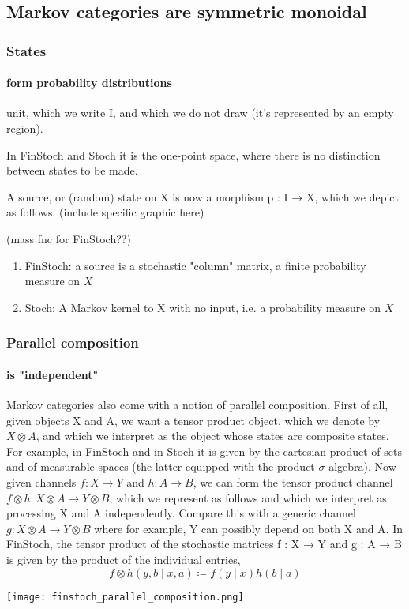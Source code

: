 \subsection{Markov categories are symmetric monoidal}
\begin{frame}
    \frametitle{States}
    \framesubtitle{form probability distributions}
unit, which we write I, and which we do not draw (it’s represented by an empty region). 

In FinStoch and Stoch it is the one-point space, where there is no distinction between states to be made.

A source, or (random) state on X is now a morphism p : I → X, which we depict as follows. (include specific graphic here)

(mass fnc for FinStoch??)
\begin{enumerate}
    \item FinStoch: a source is a stochastic "column" matrix, a finite probability measure on $X$
    \item Stoch: A Markov kernel to X with no input, i.e. a probability measure on $X$
\end{enumerate}

\end{frame}

\begin{frame}
    \frametitle{Parallel composition} 
    \framesubtitle{is "independent"}
Markov categories also come with a notion of parallel composition. First of all, given objects X and A, we want a tensor product object, which we denote by $X\otimes A$, and which we interpret as the object whose states are composite states. For example, in FinStoch and in Stoch it is given by the cartesian product of sets and of measurable spaces (the latter equipped with the product $\sigma$-algebra). Now given channels $f: X\to Y$ and $h: A\to B$, we can form the tensor product channel $f\otimes h: X\otimes A\to Y\otimes B$, which we represent as follows
and which we interpret as processing X and A independently. Compare this with a generic channel $g: X\otimes A\to Y\otimes B$
where for example, Y can possibly depend on both X and A. In FinStoch, the tensor product of the stochastic matrices f : X → Y and g : A → B is given by the product of the individual entries,
\[
    f\otimes h(y, b\mid x, a)\coloneqq f(y\mid x)h(b\mid a)
\]
\end{frame}

\begin{frame}
    \texttt{[image: finstoch\_parallel\_composition.png]}
\end{frame}

